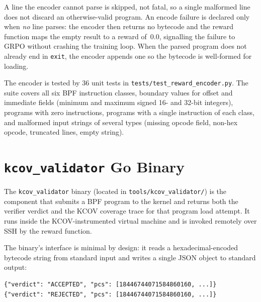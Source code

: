 A line the encoder cannot parse is skipped, not fatal, so a single malformed line
does not discard an otherwise-valid program. An encode failure is declared only when
\emph{no} line parses: the encoder then returns no bytecode and the reward function
maps the empty result to a reward of~0.0, signalling the failure to GRPO without
crashing the training loop. When the parsed program does not already end in
\texttt{exit}, the encoder appends one so the bytecode is well-formed for loading.

The encoder is tested by 36 unit tests in
\texttt{tests/test\_reward\_encoder.py}.
The suite covers all six BPF instruction classes, boundary values for offset and
immediate fields (minimum and maximum signed 16- and 32-bit integers), programs
with zero instructions, programs with a single instruction of each class, and
malformed input strings of several types (missing opcode field, non-hex opcode,
truncated lines, empty string).

\section{\texttt{kcov\_validator} Go Binary}
\label{sec:kcov-validator}

The \texttt{kcov\_validator} binary (located in \texttt{tools/kcov\_validator/})
is the component that submits a BPF program to the kernel and returns both the
verifier verdict and the KCOV coverage trace for that program load attempt.
It runs inside the KCOV-instrumented virtual machine and is invoked remotely
over SSH by the reward function.

The binary's interface is minimal by design: it reads a hexadecimal-encoded
bytecode string from standard input and writes a single JSON object to standard
output:

\begin{lstlisting}[caption={\texttt{kcov\_validator} output format}]
{"verdict": "ACCEPTED", "pcs": [18446744071584860160, ...]}
{"verdict": "REJECTED", "pcs": [18446744071584860160, ...]}
\end{lstlisting}

